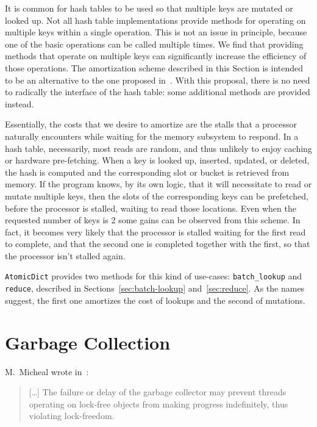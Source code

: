 It is common for hash tables to be used so that multiple keys are mutated or looked up.
Not all hash table implementations provide methods for operating on multiple keys within a single operation.
This is not an issue in principle, because one of the basic operations can be called multiple times.
We find that providing methods that operate on multiple keys can significantly increase the efficiency of those operations.
The amortization scheme described in this Section is intended to be an alternative to the one proposed in~\cite{dramhit}.
With this proposal, there is no need to radically the interface of the hash table: some additional methods are provided instead.

Essentially, the costs that we desire to amortize are the stalls that a processor naturally encounters while waiting for the memory subsystem to respond.
In a hash table, necessarily, most reads are random, and thus unlikely to enjoy caching or hardware pre-fetching.
When a key is looked up, inserted, updated, or deleted, the hash is computed and the corresponding slot or bucket is retrieved from memory.
If the program knows, by its own logic, that it will necessitate to read or mutate multiple keys, then the slots of the corresponding keys can be prefetched, before the processor is stalled, waiting to read those locations.
Even when the requested number of keys is 2 some gains can be observed from this scheme.
In fact, it becomes very likely that the processor is stalled waiting for the first read to complete, and that the second one is completed together with the first, so that the processor isn't stalled again.

\texttt{AtomicDict} provides two methods for this kind of use-cases: \texttt{{batch\_lookup}} and \texttt{reduce}, described in Sections~\ref{sec:batch-lookup} and~\ref{sec:reduce}.
As the names suggest, the first one amortizes the cost of lookups and the second of mutations.


\section{Garbage Collection}\label{sec:garbage-collection}

M.\ Micheal wrote in~\cite[\S2.3]{micheal-hash-tables}:
\begin{quote}
[\ldots]
    The failure or delay of the garbage collector may prevent threads operating on lock-free objects from making progress indefinitely, thus violating lock-freedom.
\end{quote}


